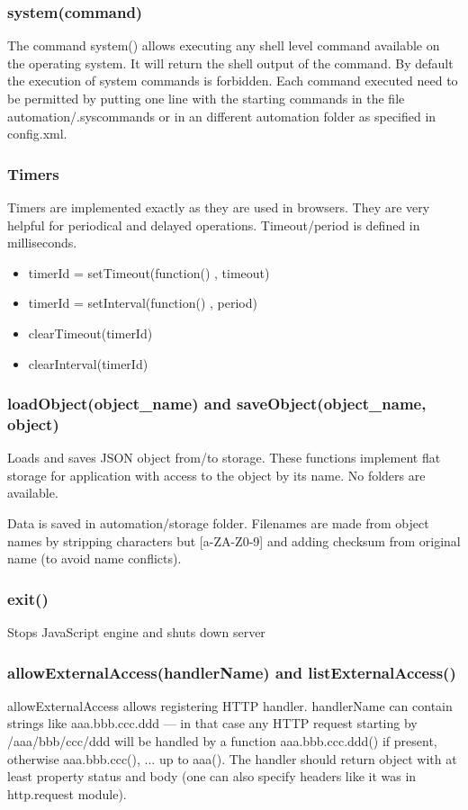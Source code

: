 \subsubsection{system(command)}

The command system() allows executing any shell level command available on the operating 
system. It will return the shell output of the command.  By default the execution of 
system commands is forbidden. Each command executed need to be permitted by putting one 
line with the starting commands in the file automation/.syscommands or in an different 
automation folder as specified in config.xml.

\subsubsection{Timers}
Timers are implemented exactly as they are used in browsers. They are very helpful for 
periodical and delayed operations. Timeout/period is defined in milliseconds.
\begin{itemize}
\item timerId = setTimeout(function() { }, timeout)
\item timerId = setInterval(function() { }, period)
\item clearTimeout(timerId)
\item clearInterval(timerId)
\end{itemize}

\subsubsection{loadObject(object\_name) and saveObject(object\_name, object)}
Loads and saves JSON object from/to storage. These functions implement flat storage for 
application with access to the object by its name. No folders are available.

Data is saved in automation/storage folder. Filenames are made from object names by 
stripping characters but [a-ZA-Z0-9] and adding checksum from original name (to avoid name conflicts).

\subsubsection{exit()}
Stops JavaScript engine and shuts down \zway server


\subsubsection{allowExternalAccess(handlerName) and listExternalAccess()}
allowExternalAccess allows registering HTTP handler. handlerName can contain strings like 
aaa.bbb.ccc.ddd --- in that case any HTTP request starting by /aaa/bbb/ccc/ddd will be 
handled by a function aaa.bbb.ccc.ddd() if present, otherwise aaa.bbb.ccc(), ... up to aaa().
The handler should return object with at least property status and body (one can also specify 
headers like it was in http.request module).

